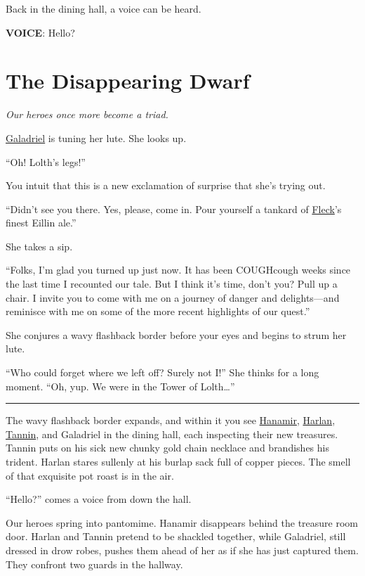 \documentclass[smalldemyvopaper,11pt,twoside,onecolumn,openright,extrafontsizes]{memoir}
\newcommand{\chapdesc}[1]{
    \begin{flushright}
    \emph{{#1}}
    \end{flushright}
    \vspace{26pt}
}
\begin{document}
Back in the dining hall, a voice can be heard.

\textbf{VOICE}: Hello?


\chapter{The Disappearing Dwarf}
\chapdesc{Our heroes once more become a triad.}

\href{/characters/galadriel/}{Galadriel} is tuning her lute. She looks
up.

``Oh! Lolth's legs!''

You intuit that this is a new exclamation of surprise that she's trying
out.

``Didn't see you there. Yes, please, come in. Pour yourself a tankard of
\href{/characters/fleck/}{Fleck}'s finest Eillin ale.''

She takes a sip.

``Folks, I'm glad you turned up just now. It has been COUGHcough weeks
since the last time I recounted our tale. But I think it's time, don't
you? Pull up a chair. I invite you to come with me on a journey of
danger and delights---and reminisce with me on some of the more recent
highlights of our quest.''

She conjures a wavy flashback border before your eyes and begins to
strum her lute.

``Who could forget where we left off? Surely not I!'' She thinks for a
long moment. ``Oh, yup. We were in the Tower of Lolth\ldots{}''

\begin{center}\rule{0.5\linewidth}{\linethickness}\end{center}

The wavy flashback border expands, and within it you see
\href{/characters/hanamir/}{Hanamir},
\href{/characters/harlan/}{Harlan}, \href{/characters/tannin/}{Tannin},
and Galadriel in the dining hall, each inspecting their new treasures.
Tannin puts on his sick new chunky gold chain necklace and brandishes
his trident. Harlan stares sullenly at his burlap sack full of copper
pieces. The smell of that exquisite pot roast is in the air.

``Hello?'' comes a voice from down the hall.

Our heroes spring into pantomime. Hanamir disappears behind the treasure
room door. Harlan and Tannin pretend to be shackled together, while
Galadriel, still dressed in drow robes, pushes them ahead of her as if
she has just captured them. They confront two guards in the hallway.
\end{document}
